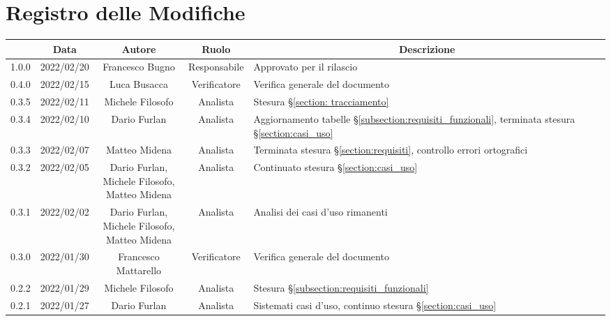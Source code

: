 \thispagestyle{empty}
\section*{Registro delle Modifiche}

\begin{center}
	\renewcommand{\arraystretch}{1.8}
	\begin{longtable}[c]{c | c | c | c | p{5cm}}
		\rowcolor[HTML]{125E28}
		\multicolumn{1}{c}{\color[HTML]{FFFFFF} \textbf{Versione}} &
		\multicolumn{1}{c}{\color[HTML]{FFFFFF} \textbf{Data}}     &
		\multicolumn{1}{c}{\color[HTML]{FFFFFF} \textbf{Autore}}   &
		\multicolumn{1}{c}{\color[HTML]{FFFFFF} \textbf{Ruolo}}    &
		\multicolumn{1}{c}{\color[HTML]{FFFFFF} \textbf{Descrizione}}                                                                                                                                                                \\
		\endhead
		1.0.0 & 2022/02/20 & Francesco Bugno & Responsabile & Approvato per il rilascio\\
		0.4.0 & 2022/02/15 & Luca Busacca & Verificatore & Verifica generale del documento\\
		0.3.5 & 2022/02/11 & Michele Filosofo & Analista & Stesura §\ref{section: tracciamento}\\
		0.3.4 & 2022/02/10 & Dario Furlan & Analista & Aggiornamento tabelle §\ref{subsection:requisiti_funzionali}, terminata stesura §\ref{section:casi_uso} \\
		0.3.3 & 2022/02/07 & Matteo Midena & Analista & Terminata stesura §\ref{section:requisiti}, controllo errori ortografici\\
		0.3.2 & 2022/02/05 & \shortstack{Dario Furlan,\\ Michele Filosofo,\\ Matteo Midena} & Analista & Continuato stesura §\ref{section:casi_uso} \\
		0.3.1 & 2022/02/02 & \shortstack{Dario Furlan,\\ Michele Filosofo,\\ Matteo Midena} & Analista & Analisi dei casi d'uso rimanenti \\
		0.3.0 & 2022/01/30 & Francesco Mattarello & Verificatore & Verifica generale del documento\\
		0.2.2 & 2022/01/29 & Michele Filosofo & Analista & Stesura §\ref{subsection:requisiti_funzionali}\\
		0.2.1 & 2022/01/27 & Dario Furlan & Analista & Sistemati casi d'uso, continuo stesura §\ref{section:casi_uso}\\

\end{longtable}
\end{center}
